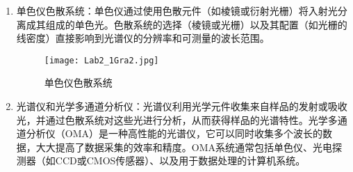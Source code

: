 \documentclass[dvipsnames, svgnames,a4paper,11pt]{article}
\begin{document}
\begin{enumerate}
		\item 单色仪色散系统：单色仪通过使用色散元件（如棱镜或衍射光栅）将入射光分离成其组成的单色光。色散系统的选择（棱镜或光栅）以及其配置（如光栅的线密度）直接影响到光谱仪的分辨率和可测量的波长范围。
		
		\begin{figure}[htbp]
			\centering
			\texttt{[image: Lab2\_1Gra2.jpg]}
			\caption{单色仪色散系统}
			\label{fig:fig2}
		\end{figure}
		
		\item 光谱仪和光学多通道分析仪：光谱仪利用光学元件收集来自样品的发射或吸收光，并通过色散系统对这些光进行分析，从而获得样品的光谱特性。光学多通道分析仪（OMA）是一种高性能的光谱仪，它可以同时收集多个波长的数据，大大提高了数据采集的效率和精度。OMA系统通常包括单色仪、光电探测器（如CCD或CMOS传感器）、以及用于数据处理的计算机系统。
	\end{enumerate}
	
\end{document}
